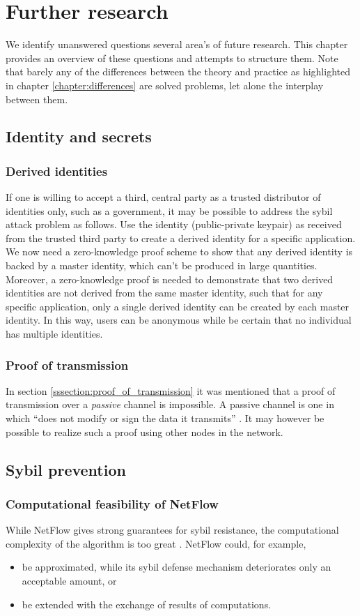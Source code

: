 \chapter{Further research}
We identify unanswered questions several area's of future research. 
This chapter provides an overview of these questions and attempts to structure them.
Note that barely any of the differences between the theory and practice as highlighted in chapter \ref{chapter:differences} are solved problems, let alone the interplay between them.

\section{Identity and secrets}
\subsection{Derived identities}
If one is willing to accept a third, central party as a trusted distributor of identities only, such as a government, it may be possible to address the sybil attack problem as follows. Use the identity (public-private keypair) as received from the trusted third party to create a derived identity for a specific application. We now need a zero-knowledge proof scheme to show that any derived identity is backed by a master identity, which can't be produced in large quantities. Moreover, a zero-knowledge proof is needed to demonstrate that two derived identities are not derived from the same master identity, such that for any specific application, only a single derived identity can be created by each master identity. In this way, users can be anonymous while be certain that no individual has multiple identities.

\subsection{Proof of transmission}
In section \ref{sssection:proof_of_transmission} it was mentioned that a proof of transmission over a \emph{passive} channel is impossible. 
A passive channel is one in which ``does not modify or sign the data it transmits'' \cite{kravchenko}. 
It may however be possible to realize such a proof using other nodes in the network.

\section{Sybil prevention}
\subsection{Computational feasibility of NetFlow}
While NetFlow gives strong guarantees for sybil resistance, the computational complexity of the algorithm is too great \cite{otte2016sybil}. NetFlow could, for example,
\begin{itemize}
	\item be approximated, while its sybil defense mechanism deteriorates only an acceptable amount, or
	\item be extended with the exchange of results of computations.
\end{itemize}

